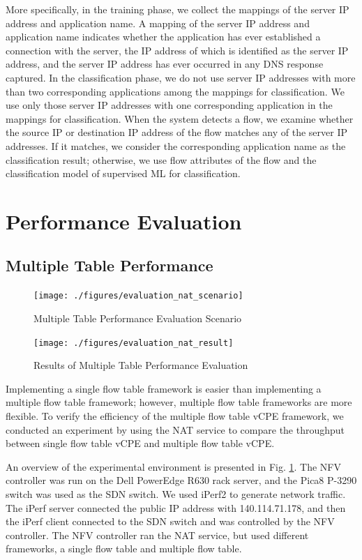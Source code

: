 \documentclass[journal]{IEEEtran}
\begin{document}
More specifically, in the training phase, we collect the mappings of the server IP address and application name. A mapping of the server IP address and application name indicates whether the application has ever established a connection with the server, the IP address of which is identified as the server IP address, and the server IP address has ever occurred in any DNS response captured. In the classification phase, we do not use server IP addresses with more than two corresponding applications among the mappings for classification. We use only those server IP addresses with one corresponding application in the mappings for classification. When the system detects a flow, we examine whether the source IP or destination IP address of the flow matches any of the server IP addresses. If it matches, we consider the corresponding application name as the classification result; otherwise, we use flow attributes of the flow and the classification model of supervised ML for classification.





\section{Performance Evaluation}
\subsection{Multiple Table Performance}

\begin{figure}[!t]
\centering
\texttt{[image: ./figures/evaluation\_nat\_scenario]}
\caption{Multiple Table Performance Evaluation Scenario}
\label{fig:evaluation_nat_scenario}
\end{figure}

\begin{figure}[!t]
\centering
\texttt{[image: ./figures/evaluation\_nat\_result]}
\caption{Results of Multiple Table Performance Evaluation}
\label{fig:evaluation_nat_result}
\end{figure}

Implementing a single flow table framework is easier than implementing a multiple flow table framework; however, multiple flow table frameworks are more flexible. To verify the efficiency of the multiple flow table vCPE framework, we conducted an experiment by using the NAT service to compare the throughput between single flow table vCPE and multiple flow table vCPE.

An overview of the experimental environment is presented in Fig. \ref{fig:evaluation_nat_scenario}. The NFV controller was run on the Dell PowerEdge R630 rack server, and the Pica8 P-3290 switch \cite{pica8-switch} was used as the SDN switch. We used iPerf2 \cite{iperf} to generate network traffic. The iPerf server connected the public IP address with 140.114.71.178, and then the iPerf client connected to the SDN switch and was controlled by the NFV controller. The NFV controller ran the NAT service, but used different frameworks, a single flow table and multiple flow table.
\end{document}
